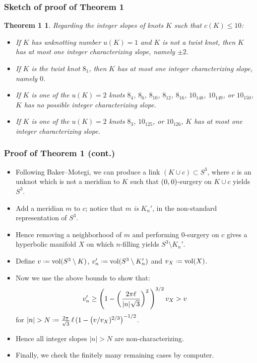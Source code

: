 \documentclass{beamer}
\newcommand{\vol}{\operatorname{vol}}
\newcommand{\defeq}{\mathrel{\vcenter{\baselineskip0.5ex\lineskiplimit0pt\hbox{\scriptsize.}\hbox{\scriptsize.}}}=}
\newcommand{\hs}{\hspace{0.05em}} %
\newtheorem{theorem1}[theorem]{Theorem 1}
\theoremstyle{ex}
\theoremstyle{rem}
\begin{document}
	\begin{frame}
		\frametitle{Sketch of proof of Theorem 1}
		\begin{theorem1}
			Regarding the integer slopes of knots $K$ such that $c(K) \leq 10$:
			\begin{itemize}
				\item If $K$ has unknotting number $u(K) = 1$ and $K$ is not a twist knot, then $K$ has at most \textit{one} integer characterizing slope, namely $\pm 2$.
				\item If $K$ is the twist knot $8_1$, then $K$ has at most \textit{one} integer characterizing slope, namely $0$.
				\item If $K$ is one of the $u(K) = 2$ knots $8_4$, $8_6$, $8_{10}$, $8_{12}$, $8_{16}$, $10_{148}$, $10_{149}$, or $10_{150}$, $K$ has no possible integer characterizing slope.
				\item If $K$ is one of the $u(K) = 2$ knots $8_3$, $10_{125}$, or $10_{126}$, $K$ has at most \textit{one} integer characterizing slope.
			\end{itemize}
		\end{theorem1}
	\end{frame}
	
	\begin{frame}
		\frametitle{Proof of Theorem 1 (cont.)}
		\begin{itemize}
			\item Following Baker--Motegi, we can produce a link $(K\cup c)\subset S^3$, where $c$ is an unknot which is not a meridian to $K$ such that $(0,\hs0)$-surgery on $K\cup c$ yields $S^3$.
			\pause
			\item Add a meridian $m$ to $c$; notice that $m$ \textit{is} $K_n'$, in the non-standard representation of $S^3$.
			\pause
			\item Hence removing a neighborhood of $m$ and performing $0$-surgery on $c$ gives a hyperbolic manifold $X$ on which $n$-filling yields $S^3\setminus K_n'$.
			\pause
			\item Define $v\defeq\vol(S^3\setminus K)$, $v_n'\defeq\vol(S^3\setminus K_n')$ and $v_X\defeq\vol(X)$.
			\pause
			\item Now we use the above bounds to show that:
			\pause
			$$v_n'\ge\left(1-\left(\frac{2\pi\ell}{|n|\hs\sqrt{3}}\right)^2\,\right)^{3/2}v_X>v$$
			for $|n|>N\defeq\frac{2\pi}{\sqrt{3}}\,\ell\,(1-\left(v/v_X)^{2/3}\right)^{-1/2}$.
			\pause
			\item Hence all integer slopes $|n|>N$ are non-characterizing.
			\pause
			\item Finally, we check the finitely many remaining cases by computer.
		\end{itemize}
	\end{frame}
\end{document}
